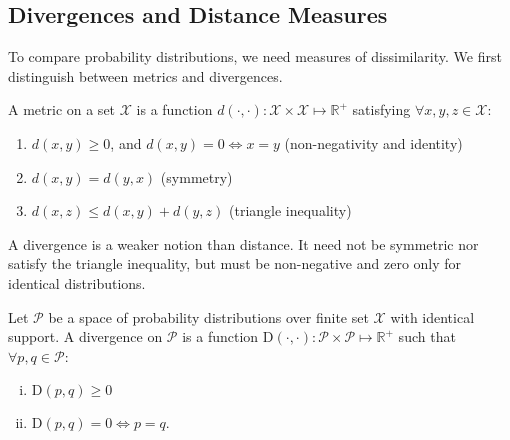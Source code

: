\subsection{Divergences and Distance Measures}
To compare probability distributions, we need measures of dissimilarity. We first distinguish between metrics and divergences.
\begin{definition}
	A \textnormal{\sffamily metric} on a set $\mathcal{X}$ is a function $d(\cdot, \cdot): \mathcal{X} \times \mathcal{X} \mapsto \mathbb{R}^+$ satisfying $\forall x, y, z \in \mathcal{X}$:
	\begin{enumerate}
		\item $d(x, y) \geq 0$, and $d(x, y) = 0 \iff x = y$ (non-negativity and identity)
		\item $d(x, y) = d(y, x)$ (symmetry)
		\item $d(x, z) \leq d(x, y) + d(y, z)$ (triangle inequality)
	\end{enumerate}
\end{definition}
\begin{remark}
	A divergence is a weaker notion than distance. It need not be symmetric nor satisfy the triangle inequality, but must be non-negative and zero only for identical distributions.
\end{remark}
\begin{definition}
	Let $\mathcal{P}$ be a space of probability distributions over finite set $\mathcal{X}$ with identical support. A \textnormal{\sffamily divergence} on $\mathcal{P}$ is a function $\text{D}(\cdot, \cdot): \mathcal{P} \times \mathcal{P} \mapsto \mathbb{R}^+$ such that $\forall p, q \in \mathcal{P}$:
	\begin{enumerate}[(i)]
		\item $\text{D}(p, q) \geq 0$
		\item $\text{D}(p, q) = 0 \iff p = q$.
	\end{enumerate}
\end{definition}
